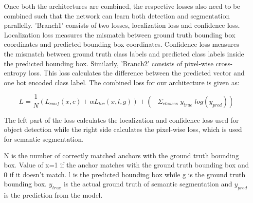 Once both the architectures are combined, the respective losses also need to be combined such that the network can learn both detection and segmentation parallelly. 'Branch1' consists of two losses, localization loss and confidence loss. Localization loss measures the mismatch between ground truth bounding box coordinates and predicted bounding box coordinates. Confidence loss measures the mismatch between ground truth class labels and predicted class labels inside the predicted bounding box. Similarly, 'Branch2' consists of pixel-wise cross-entropy loss. This loss calculates the difference between the predicted vector and one hot encoded class label. The combined loss for our architecture is given as: 

\begin{equation}
    L = \frac{1}{N} (L_{conf} (x,c) + \alpha L_{loc} (x,l,g)) + (-\Sigma_{classes}\;y_{true}\;log(y_{pred}))
\end{equation}

The left part of the loss calculates the localization and confidence loss used for object detection while the right side calculates the pixel-wise loss, which is used for semantic segmentation.  
\par

N is the number of correctly matched anchors with the ground truth bounding box. Value of x=1 if the anchor matches with the ground truth bounding box and 0 if it doesn't match. l is the predicted bounding box while g is the ground truth bounding box. $y_{true}$ is the actual ground truth of semantic segmentation and $y_{pred}$ is the prediction from the model.

\clearpage



\afterpage{\null\newpage}


